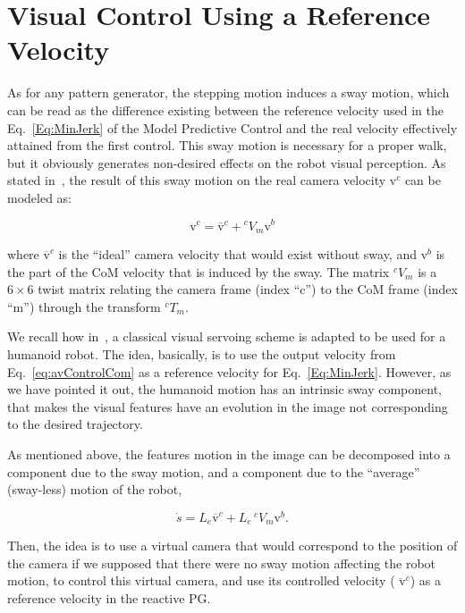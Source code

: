 \section{Visual Control Using a Reference Velocity}
\label{sec:vsclaire}


As for any pattern generator, the stepping motion induces a sway motion, which can be read as the difference existing between the reference velocity used in the Eq.~\ref{Eq:MinJerk} of the Model Predictive Control and the real velocity effectively attained from the first control. This sway motion is necessary for a proper walk, but it obviously generates non-desired effects on the robot visual perception. As stated in~\citep{DuneIROS2010}, the result of this sway motion on the real camera velocity $\text{v}^c$ can be modeled as:

\begin{equation}
\text{{v}}^c =\overline{\text{{v}}}^c+{^{c}  V_{m}} \text{{v}}^b
\label{eq:sway}
\end{equation}

\noindent where $\overline{\text{{v}}}^c$ is the ``ideal'' camera velocity that would exist without sway, and $\text{{v}}^b$ is the part of the CoM velocity that is induced by the sway. The matrix ${^c  V_{m}}$ is a $6\times6$ twist matrix relating the camera frame (index ``c'') to the CoM frame (index ``m'') through the transform ${^cT_{m}}$.

We recall how in~\citep{DuneIROS2010}, a classical visual servoing scheme is adapted to be used for a humanoid robot. The idea, basically, is to use the output velocity from Eq.~\ref{eq:avControlCom} as a reference velocity for Eq.~\ref{Eq:MinJerk}. However, as we have pointed it out, the humanoid motion has an intrinsic sway component, that makes the visual features have an evolution in the image not corresponding to the desired trajectory. 

As mentioned above, the features motion in the image can be decomposed into a component due to the sway motion, and a component due to the ``average'' (sway-less) motion of the robot,

\begin{equation}
\label{Eq:FeaturesSway}
\dot{ s}={ L_e} \overline{\text{v}}^c+ { L_e} \, ^c  V_{m}{\text{v}^{b}}.
\end{equation}

Then, the idea is to use a virtual camera that would correspond to the position of the camera if we supposed that there were no sway motion affecting the robot motion, to control this virtual camera, and use its controlled velocity ($\overline{\text{ v}}^c$) as a reference velocity in the reactive PG.
 
